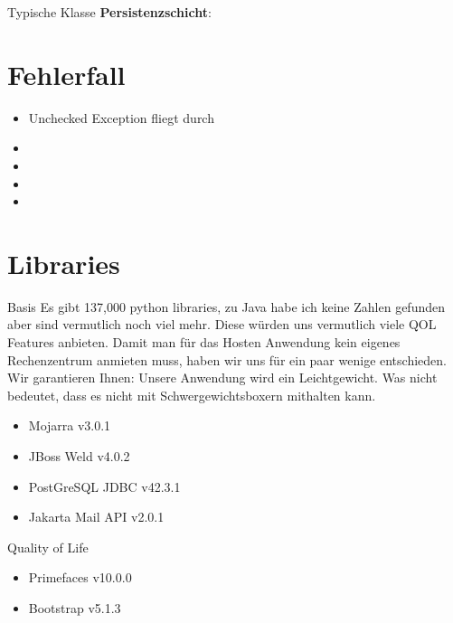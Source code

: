 \documentclass{beamer}
\begin{document}
\begin{frame}{Typische Klasse \textbf{Persistenzschicht}:}
        \section{Fehlerfall}
        \begin{frame}
            \begin{itemize}
                \item Unchecked Exception fliegt durch %
                \item %
                \item
                \item
            \item %
            \end{itemize}
        \end{frame}


        \section{Libraries}
        \begin{frame}{Basis}
            Es gibt 137,000 python libraries, zu Java habe ich keine Zahlen gefunden aber sind vermutlich noch viel mehr.
            Diese würden uns vermutlich viele QOL Features anbieten.
            Damit man für das Hosten Anwendung kein eigenes Rechenzentrum anmieten muss,
            haben wir uns für ein paar wenige entschieden.
            Wir garantieren Ihnen: Unsere Anwendung wird ein Leichtgewicht.
            Was nicht bedeutet, dass es nicht mit Schwergewichtsboxern mithalten kann.
            \begin{itemize}
                \item Mojarra v3.0.1
                \item JBoss Weld v4.0.2
                \item PostGreSQL JDBC v42.3.1
                \item Jakarta Mail API v2.0.1
            \end{itemize}
        \end{frame}

        \begin{frame}{Quality of Life}
            \begin{itemize}
                \item Primefaces v10.0.0
                \item Bootstrap v5.1.3
            \end{itemize}
        \end{frame}


\end{frame}
\end{document}
